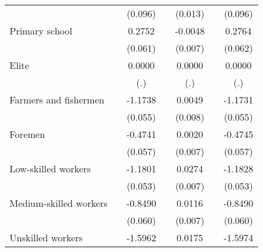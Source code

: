 \begin{table}[htbp]
\begin{tabular}{l*{6}{c}}
                    &                     &     (0.096)         &                     &     (0.013)         &                     &     (0.096)         \\
[1em]
Primary school      &                     &      0.2752\sym{***}&                     &     -0.0048         &                     &      0.2764\sym{***}\\
                    &                     &     (0.061)         &                     &     (0.007)         &                     &     (0.062)         \\
[1em]
Elite               &                     &      0.0000         &                     &      0.0000         &                     &      0.0000         \\
                    &                     &         (.)         &                     &         (.)         &                     &         (.)         \\
[1em]
Farmers and fishermen&                     &     -1.1738\sym{***}&                     &      0.0049         &                     &     -1.1731\sym{***}\\
                    &                     &     (0.055)         &                     &     (0.008)         &                     &     (0.055)         \\
[1em]
Foremen             &                     &     -0.4741\sym{***}&                     &      0.0020         &                     &     -0.4745\sym{***}\\
                    &                     &     (0.057)         &                     &     (0.007)         &                     &     (0.057)         \\
[1em]
Low-skilled workers &                     &     -1.1801\sym{***}&                     &      0.0274\sym{***}&                     &     -1.1828\sym{***}\\
                    &                     &     (0.053)         &                     &     (0.007)         &                     &     (0.053)         \\
[1em]
Medium-skilled workers&                     &     -0.8490\sym{***}&                     &      0.0116         &                     &     -0.8490\sym{***}\\
                    &                     &     (0.060)         &                     &     (0.007)         &                     &     (0.060)         \\
[1em]
Unskilled workers   &                     &     -1.5962\sym{***}&                     &      0.0175\sym{*}  &                     &     -1.5974\sym{***}\\

\end{tabular}
\end{table}
